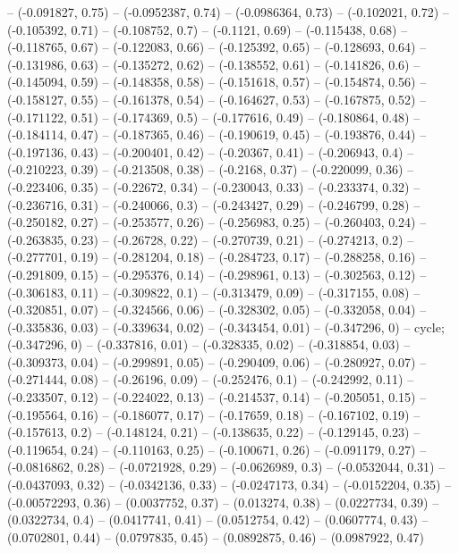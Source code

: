 -- (-0.091827, 0.75)
-- (-0.0952387, 0.74)
-- (-0.0986364, 0.73)
-- (-0.102021, 0.72)
-- (-0.105392, 0.71)
-- (-0.108752, 0.7)
-- (-0.1121, 0.69)
-- (-0.115438, 0.68)
-- (-0.118765, 0.67)
-- (-0.122083, 0.66)
-- (-0.125392, 0.65)
-- (-0.128693, 0.64)
-- (-0.131986, 0.63)
-- (-0.135272, 0.62)
-- (-0.138552, 0.61)
-- (-0.141826, 0.6)
-- (-0.145094, 0.59)
-- (-0.148358, 0.58)
-- (-0.151618, 0.57)
-- (-0.154874, 0.56)
-- (-0.158127, 0.55)
-- (-0.161378, 0.54)
-- (-0.164627, 0.53)
-- (-0.167875, 0.52)
-- (-0.171122, 0.51)
-- (-0.174369, 0.5)
-- (-0.177616, 0.49)
-- (-0.180864, 0.48)
-- (-0.184114, 0.47)
-- (-0.187365, 0.46)
-- (-0.190619, 0.45)
-- (-0.193876, 0.44)
-- (-0.197136, 0.43)
-- (-0.200401, 0.42)
-- (-0.20367, 0.41)
-- (-0.206943, 0.4)
-- (-0.210223, 0.39)
-- (-0.213508, 0.38)
-- (-0.2168, 0.37)
-- (-0.220099, 0.36)
-- (-0.223406, 0.35)
-- (-0.22672, 0.34)
-- (-0.230043, 0.33)
-- (-0.233374, 0.32)
-- (-0.236716, 0.31)
-- (-0.240066, 0.3)
-- (-0.243427, 0.29)
-- (-0.246799, 0.28)
-- (-0.250182, 0.27)
-- (-0.253577, 0.26)
-- (-0.256983, 0.25)
-- (-0.260403, 0.24)
-- (-0.263835, 0.23)
-- (-0.26728, 0.22)
-- (-0.270739, 0.21)
-- (-0.274213, 0.2)
-- (-0.277701, 0.19)
-- (-0.281204, 0.18)
-- (-0.284723, 0.17)
-- (-0.288258, 0.16)
-- (-0.291809, 0.15)
-- (-0.295376, 0.14)
-- (-0.298961, 0.13)
-- (-0.302563, 0.12)
-- (-0.306183, 0.11)
-- (-0.309822, 0.1)
-- (-0.313479, 0.09)
-- (-0.317155, 0.08)
-- (-0.320851, 0.07)
-- (-0.324566, 0.06)
-- (-0.328302, 0.05)
-- (-0.332058, 0.04)
-- (-0.335836, 0.03)
-- (-0.339634, 0.02)
-- (-0.343454, 0.01)
-- (-0.347296, 0)
-- cycle;
\drawBand (-0.347296, 0)
-- (-0.337816, 0.01)
-- (-0.328335, 0.02)
-- (-0.318854, 0.03)
-- (-0.309373, 0.04)
-- (-0.299891, 0.05)
-- (-0.290409, 0.06)
-- (-0.280927, 0.07)
-- (-0.271444, 0.08)
-- (-0.26196, 0.09)
-- (-0.252476, 0.1)
-- (-0.242992, 0.11)
-- (-0.233507, 0.12)
-- (-0.224022, 0.13)
-- (-0.214537, 0.14)
-- (-0.205051, 0.15)
-- (-0.195564, 0.16)
-- (-0.186077, 0.17)
-- (-0.17659, 0.18)
-- (-0.167102, 0.19)
-- (-0.157613, 0.2)
-- (-0.148124, 0.21)
-- (-0.138635, 0.22)
-- (-0.129145, 0.23)
-- (-0.119654, 0.24)
-- (-0.110163, 0.25)
-- (-0.100671, 0.26)
-- (-0.091179, 0.27)
-- (-0.0816862, 0.28)
-- (-0.0721928, 0.29)
-- (-0.0626989, 0.3)
-- (-0.0532044, 0.31)
-- (-0.0437093, 0.32)
-- (-0.0342136, 0.33)
-- (-0.0247173, 0.34)
-- (-0.0152204, 0.35)
-- (-0.00572293, 0.36)
-- (0.0037752, 0.37)
-- (0.013274, 0.38)
-- (0.0227734, 0.39)
-- (0.0322734, 0.4)
-- (0.0417741, 0.41)
-- (0.0512754, 0.42)
-- (0.0607774, 0.43)
-- (0.0702801, 0.44)
-- (0.0797835, 0.45)
-- (0.0892875, 0.46)
-- (0.0987922, 0.47)
